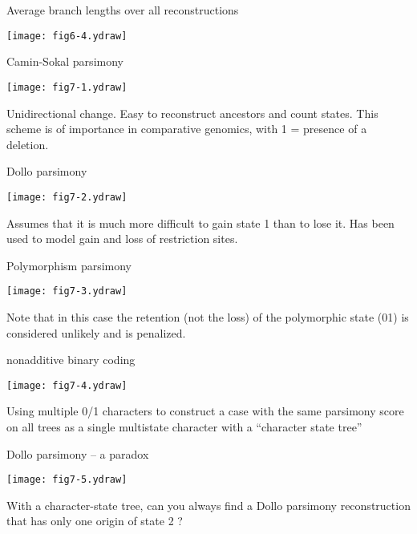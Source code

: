\documentclass[bluish,slideColor,colorBG,pdf]{prosper}
\begin{document}
\begin{slide}[Replace]{Average branch lengths over all reconstructions}

\centerline{\texttt{[image: fig6-4.ydraw]}}

\end{slide}

\begin{slide}[Replace]{Camin-Sokal parsimony}

\centerline{\texttt{[image: fig7-1.ydraw]}}
\bigskip

Unidirectional change.  Easy to reconstruct ancestors and count states.  This
scheme is of importance in comparative genomics, with 1 = presence of a
deletion.

\end{slide}

\begin{slide}[Replace]{Dollo parsimony}

\centerline{\texttt{[image: fig7-2.ydraw]}}
\bigskip

Assumes that it is much more difficult to gain state 1 than to lose it.
Has been used to model gain and loss of restriction sites.

\end{slide}

\begin{slide}[Replace]{Polymorphism parsimony}

\centerline{\texttt{[image: fig7-3.ydraw]}}
\bigskip

Note that in this case the retention (not the loss) of the polymorphic state 
(01) is considered unlikely and is penalized.

\end{slide}

\begin{slide}[Replace]{nonadditive binary coding}

\centerline{\texttt{[image: fig7-4.ydraw]}}
\bigskip

Using multiple 0/1 characters to construct a case with the same parsimony
score on all trees as a single multistate character with a ``character state
tree''

\end{slide}

\begin{slide}[Replace]{Dollo parsimony -- a paradox}

\centerline{\texttt{[image: fig7-5.ydraw]}}
\bigskip

With a character-state tree, can you always find a Dollo parsimony
reconstruction that has only one origin of state 2 ?

\end{slide}
\end{document}
